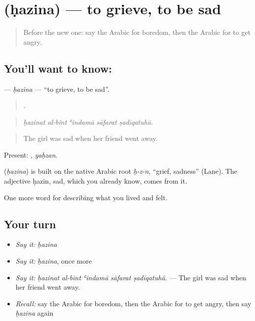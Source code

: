 \section[\texorpdfstring{\ar{حزن} (ḥazina)}{حزن (ḥazina)}]{ (ḥazina) — to grieve, to be sad}

\label{lesson:AR-C488-hazina}



\begin{quote}
Before the new one: say the Arabic for boredom, then the Arabic for to get angry.
\end{quote}

\subsection*{You'll want to know: }
\textbf{} — \emph{ḥazina} — \textquotedblleft{}to grieve, to be sad\textquotedblright{}.

\begin{quote}
    .
\end{quote}

\begin{quote}
\emph{ḥazinat al-bint ʿindamā sāfarat ṣadīqatuhā.}
\end{quote}

\begin{quote}
The girl was sad when her friend went away.
\end{quote}

Present: , \emph{yaḥzan}.

\begin{cousinweb}
\textbf{} (\emph{ḥazina}) is built on the native Arabic root \emph{ḥ-z-n}, \textquotedblleft{}grief, sadness\textquotedblright{} (Lane). The adjective ḥazīn, sad, which you already know, comes from it.
\end{cousinweb}

\begin{grammarlens}[title={What you've built}]
One more word for describing what you lived and felt.
\end{grammarlens}

\subsection*{Your turn}
\begin{itemize}
\raggedright
  \item \emph{Say it:} \emph{ḥazina}
  \item \emph{Say it:} \emph{ḥazina}, once more
  \item \emph{Say it:} \emph{ḥazinat al-bint ʿindamā sāfarat ṣadīqatuhā.} — The girl was sad when her friend went away.
  \item \emph{Recall:} say the Arabic for boredom, then the Arabic for to get angry, then say \emph{ḥazina} again
\end{itemize}

